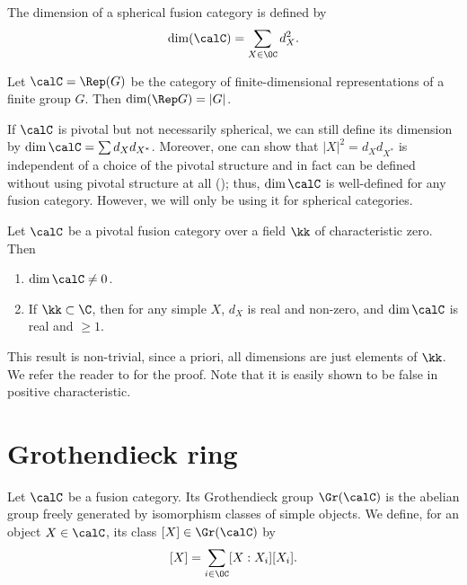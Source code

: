 \begin{definition}
  The dimension of a spherical fusion category is defined by
  $$
    \dim(\calC)=\sum_{X\in \OC} d_X^2.
  $$
\end{definition}

\begin{example}\label{x:dim-repg}
  Let $\calC=\Rep(G)$ be the category of finite-dimensional representations of
  a finite group $G$. Then $\dim (\Rep G)=|G|$.
\end{example}

\begin{remark}
  If $\calC$ is pivotal but not necessarily spherical, we can still define its
  dimension by $\dim \calC=\sum d_X d_{X^*}$. Moreover, one can show that
  $|X|^2=d_X d_{X^*}$ is independent of a choice of the pivotal structure and in
  fact can be defined without using pivotal structure at all
  (\cite[Section 7.21]{etingof-fusion}); thus, $\dim \calC$ is well-defined
  for any fusion category. However, we will only be using it for spherical
  categories.
\end{remark}

\begin{theorem}\label{t:dim-nonzero}
  Let $\calC$ be a pivotal fusion category over a field $\kk$ of
  characteristic zero. Then
  \begin{enumerate}
    \item $\dim \calC\ne 0$.
    \item If $\kk\subset\C$, then for any simple $X$,
  $d_X$ is real and non-zero, and $\dim \calC$ is real and $\ge1$.
  \end{enumerate}
\end{theorem}
This result is non-trivial, since a priori, all dimensions are just elements of
$\kk$. We refer the reader to \cite[Theorem 7.21.12]{etingof-fusion} for the
proof. Note that it is easily shown to be false in positive characteristic.

\section{Grothendieck ring}\label{s:grothendieck-ring}
\begin{definition}\label{d:grothendieck}
  Let $\calC$ be a fusion category. Its Grothendieck group $\Gr(\calC)$ is the
  abelian group freely generated by isomorphism classes of simple objects. We
  define, for an object $X\in \calC$, its class $[X]\in \Gr(\calC)$ by
  $$
    [X]=\sum_{i\in \OC} [X:X_i] [X_i].
  $$
\end{definition}

